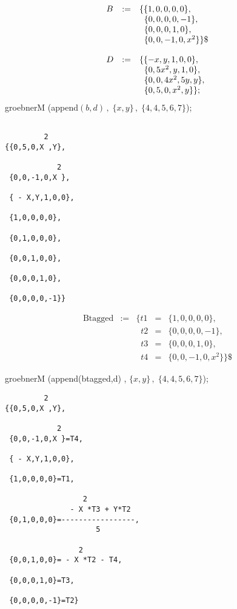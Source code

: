 \example {}

\[
\begin{array}{lll}
B & := & \{\{  1 ,  0  ,  0  ,  0  ,  0 \}, \\
& & \;\;\{  0 ,  0  ,  0  ,  0  , -1\}, \\
& & \;\;\{  0 ,  0  ,  0  ,  1  ,  0\}, \\
& & \;\;\{  0 ,  0  , -1  ,  0  , x^2\}\}\$ \vspace*{4mm} \\
D & := & \{\{ -x ,  y  ,  1  ,  0  ,  0 \}, \\
& &\;\;\{  0 ,5x^2 ,  y  ,  1  ,  0 \}, \\
& &\;\;\{  0 ,  0  ,4x^2 , 5y  , y\}, \\
& &\;\;\{  0 ,  5  ,  0  , x^2 ,  y \}\};
\end{array}
\]
groebnerM (append$(b,d)\, ,\;\{x,y\}\,, \;\{4,4,5,6,7\}$);

\begin{verbatim}

         2
{{0,5,0,X ,Y},

            2
 {0,0,-1,0,X },

 { - X,Y,1,0,0},

 {1,0,0,0,0},

 {0,1,0,0,0},

 {0,0,1,0,0},

 {0,0,0,1,0},

 {0,0,0,0,-1}}

\end{verbatim}
\[
\begin{array}{lllll}
\mbox{Btagged} & := & \{t1 & = & \{  1 ,  0  ,  0  ,  0  ,  0 \}, \\
& & \;\; t2 & = & \{  0 ,  0  ,  0  ,  0  , -1 \}, \\
& & \;\; t3 & = & \{  0 ,  0  ,  0  ,  1  ,  0 \}, \\
& & \;\; t4 & = & \{  0 ,  0  , -1  ,  0  , x^2 \}\}\$
\end{array}
\]

\noindent groebnerM (append(btagged,d) , $\{x,y\} \,, \;\{4,4,5,6,7\}$);

\begin{verbatim}
         2
{{0,5,0,X ,Y},

            2
 {0,0,-1,0,X }=T4,

 { - X,Y,1,0,0},

 {1,0,0,0,0}=T1,

                  2
               - X *T3 + Y*T2
 {0,1,0,0,0}=-----------------,
                     5

                 2
 {0,0,1,0,0}= - X *T2 - T4,

 {0,0,0,1,0}=T3,

 {0,0,0,0,-1}=T2}

\end{verbatim}

